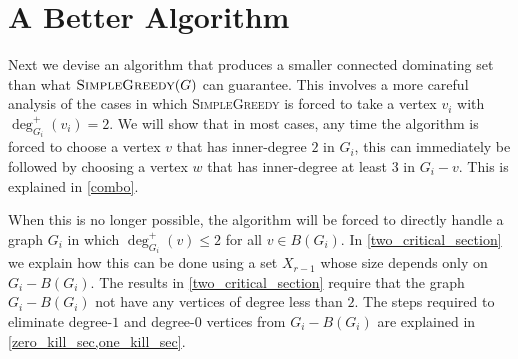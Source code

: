 \documentclass[a4paper,UKenglish,cleveref, autoref, thm-restate]{lipics-v2021}
\begin{document}
%
%

\section{A Better Algorithm}
\label{full_result}

Next we devise an algorithm that produces a smaller connected dominating set than what $\textsc{SimpleGreedy}(G)$ can guarantee.  This involves a more careful analysis of the cases in which \textsc{SimpleGreedy} is forced to take a vertex $v_i$ with $\deg^+_{G_i}(v_i)=2$.  We will show that in most cases, any time the algorithm is forced to choose a vertex $v$ that has inner-degree $2$ in $G_i$, this can immediately be followed by choosing a vertex $w$ that has inner-degree at least $3$ in $G_i-v$.  This is explained in \cref{combo}.

When this is no longer possible, the algorithm will be forced to directly handle a graph $G_i$ in which $\deg^+_{G_i}(v)\le 2$ for all $v\in B(G_i)$.  In \cref{two_critical_section} we explain how this can be done using a set $X_{r-1}$ whose size depends only on $G_i-B(G_i)$.  The results in \cref{two_critical_section} require that the graph $G_i-B(G_i)$ not have any vertices of degree less than $2$.  The steps required to eliminate degree-$1$ and degree-$0$ vertices from $G_i-B(G_i)$ are explained in \cref{zero_kill_sec,one_kill_sec}.
\end{document}
